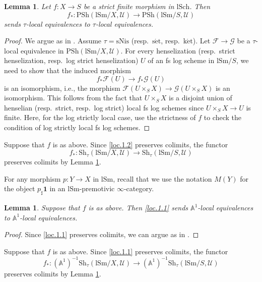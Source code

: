 \documentclass[10pt]{amsart}
\newtheorem{lem}[thm]{Lemma}
\theoremstyle{definition}
\theoremstyle{remark}
\numberwithin{equation}{subsection}
\newcommand{\A}{\mathbb{A}}
\newcommand{\cF}{\mathcal{F}}
\newcommand{\cG}{\mathcal{G}}
\newcommand{\cU}{\mathcal{U}}
\newcommand{\lSch}{\mathrm{lSch}}
\newcommand{\lSm}{\mathrm{lSm}}
\newcommand{\infPsh}{\mathrm{PSh}}
\newcommand{\infShv}{\mathrm{Sh}}
\newcommand{\unit}{\mathbf{1}}
\newcommand{\sNis}{\mathrm{sNis}}
\newcommand{\ketale}{\mathrm{k\acute{e}t}}
\newcommand{\setale}{\mathrm{s\acute{e}t}}
\begin{document}
\begin{lem}
\label{loc.1}
Let $f\colon X\to S$ be a strict finite morphism in $\lSch$.
Then
\begin{equation}
\label{loc.1.2}
f_*\colon \infPsh(\lSm/X,\cU)\to \infPsh(\lSm/S,\cU)
\end{equation}
sends $\tau$-local equivalences to $\tau$-local equivalences.
\end{lem}
\begin{proof}
We argue as in \cite[Proposition 1.27, p.\ 105]{MV}.
Assume $\tau=\sNis$ (resp.\ $\setale$, resp.\ $\ketale$).
Let $\cF\to \cG$ be a $\tau$-local equivalence in $\infPsh(\lSm/X,\cU)$.
For every henselization (resp.\ strict henselization, resp.\ log strict henselization) $U$ of an fs log scheme in $\lSm/S$, we need to show that the induced morphism
\[
f_*\cF(U)\to f_*\cG(U)
\]
is an isomorphism, i.e., the morphism $\cF(U\times_S X)\to \cG(U\times_S X)$ is an isomorphism.
This follows from the fact that $U\times_S X$ is a disjoint union of henselian (resp.\ strict, resp.\ log strict) local fs log schemes since $U\times_S X\to U$ is finite.
Here, for the log strictly local case,
use the strictness of $f$ to check the condition of log strictly local fs log schemes.
\end{proof}

Suppose that $f$ is as above.
Since \eqref{loc.1.2} preserves colimits, the functor
\begin{equation}
\label{loc.1.1}
f_*\colon \infShv_{\tau}(\lSm/X,\cU)\to \infShv_{\tau}(\lSm/S,\cU)
\end{equation}
preserves colimits by Lemma \ref{loc.1}.

For any morphism $p\colon Y\to X$ in $\lSm$, recall that we use the notation $M(Y)$ for the object $p_\sharp \unit$ in an $\lSm$-premotivic $\infty$-category.

\begin{lem}
\label{loc.2}
Suppose that $f$ is as above.
Then \eqref{loc.1.1} sends $\A^1$-local equivalences to $\A^1$-local equivalences.
\end{lem}
\begin{proof}
Since \eqref{loc.1.1} preserves colimits,
we can argue as in \cite[Th\'eorem 4.5.34]{Ayo072}.
\end{proof}

Suppose that $f$ is as above.
Since \eqref{loc.1.1} preserves colimits, the functor
\begin{equation}
\label{loc.2.1}
f_*\colon (\A^1)^{-1}\infShv_{\tau}(\lSm/X,\cU)\to (\A^1)^{-1}\infShv_{\tau}(\lSm/S,\cU)
\end{equation}
preserves colimits by Lemma \ref{loc.2}.
\end{document}

